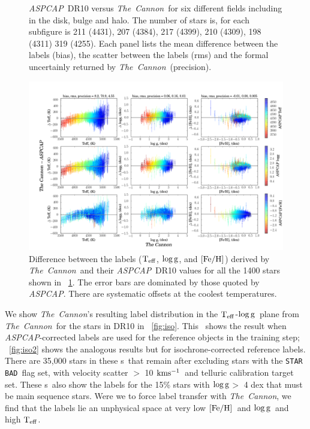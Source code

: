 \documentclass[12pt, preprint]{aastex}
\newcommand{\figurenames}{\figurename s}
\newcommand{\tc}{\textsl{The~Cannon}}
\newcommand{\aspcap}{\textsl{ASPCAP}}
\newcommand{\badstar}{\texttt{STAR BAD}}
\newcommand{\teff}{\mbox{$\rm T_{eff}$}}
\newcommand{\kms}{\mbox{$\rm kms^{-1}$}}
\newcommand{\feh}{\mbox{$\rm [Fe/H]$}}
\newcommand{\logg}{\mbox{$\rm \log g$}}
\begin{document}
\begin{figure}[!h]
\caption{\small{\aspcap\ DR10 versus \tc\ for six different fields including in the disk, bulge and halo. The number of stars is, for each subfigure is 211 (4431), 207 (4384), 217 (4399), 210 (4309), 198 (4311) 319 (4255). Each panel lists the mean difference between the labels (bias), the scatter between the labels (rms) and the formal uncertainly returned by \tc\ (precision). }}
\label{fig:cal}
\end{figure}

\begin{figure}[!h]
\centering
        \includegraphics[scale=0.35]{./plots/cplot2.png} 
\caption{Difference between the labels (\teff, \logg, and \feh) derived by \tc\ and their \aspcap\ DR10 values for all the 1400 stars shown in \figurename~\ref{fig:cal}. The error bars are dominated by those quoted by \aspcap. There are systematic offsets at the coolest temperatures.}
\label{fig:cplot}
\end{figure}


We show \tc 's resulting label distribution in the \teff-\logg\ plane from \tc\ for the stars in DR10 in \figurename~\ref{fig:iso}. 
This \figurename\ shows the result when \aspcap -corrected labels are used for the reference objects in the training step; \figurename~\ref{fig:iso2} shows the analogous results but for isochrone-corrected reference labels. There are 35,000 stars in these \figurenames\ that remain after excluding stars with the \badstar\ flag set, with velocity scatter $>$ 10 \kms\ and telluric calibration target set. These \figurenames\ also show the labels for the 15\% stars with \logg $>$ 4 dex that must be main sequence stars. 
 Were we to force label transfer with \tc , we find that the labels lie an unphysical space at very low \feh\ and \logg\ and high \teff.
\end{document}
